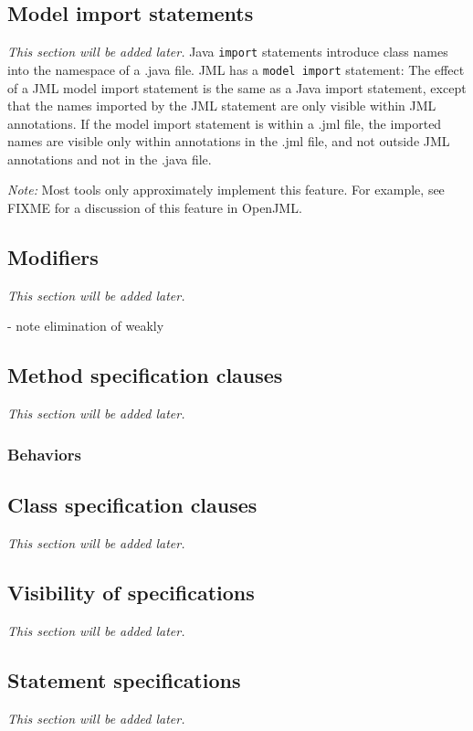 \subsection{Model import statements}
\textit{This section will be added later.} %
Java \texttt{import} statements introduce class names into the namespace of a .java file.
JML has a \texttt{model import} statement:
The effect of a JML model import statement is the same as a Java import statement, except that the names imported by the JML statement are only visible within JML annotations. If the model import statement is within a .jml file, the imported names are
visible only within annotations in the .jml file, and not outside JML annotations and not in the .java file.

\textit{Note:} Most tools only approximately implement this feature. For example, see FIXME for a discussion of this feature in OpenJML.


\subsection{Modifiers}
\textit{This section will be added later.} %

- note elimination of weakly

\subsection{Method specification clauses}
\textit{This section will be added later.} %

\subsubsection{Behaviors}

\subsection{Class specification clauses}
\textit{This section will be added later.} %

\subsection{Visibility of specifications}
\textit{This section will be added later.} %

\subsection{Statement specifications}
\textit{This section will be added later.} %

